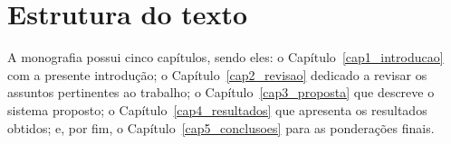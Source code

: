 \section{Estrutura do texto}
{ A monografia possui cinco capítulos, sendo eles: o Capítulo~\ref{cap1_introducao}
    com a presente introdução; o Capítulo~\ref{cap2_revisao} dedicado a revisar
    os assuntos pertinentes ao trabalho; o Capítulo~\ref{cap3_proposta} que
    descreve o sistema proposto; o Capítulo~\ref{cap4_resultados} que apresenta
    os resultados obtidos; e, por fim, o Capítulo~\ref{cap5_conclusoes} para as
    ponderações finais.
}


